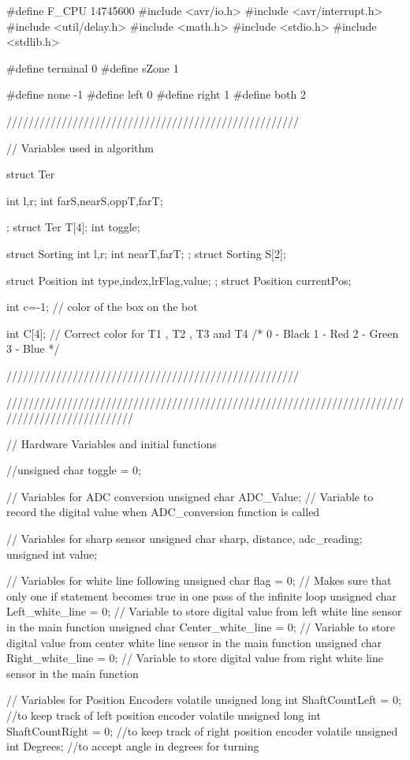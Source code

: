 #define F_CPU 14745600
#include <avr/io.h>
#include <avr/interrupt.h>
#include <util/delay.h>
#include <math.h>
#include <stdio.h>
#include <stdlib.h>

#define terminal 0
#define sZone 1

#define none -1
#define left 0
#define right 1
#define both 2

/////////////////////////////////////////////////////


// Variables used in algorithm

struct Ter
{
	
	int l,r;
	int farS,nearS,oppT,farT;
	};
struct Ter T[4];
int toggle;

struct Sorting
{
	int l,r;
	int nearT,farT;
};
struct Sorting S[2];

struct Position
{
       int type,index,lrFlag,value;
};
struct Position currentPos;


int c=-1; // color of the box on the bot

int C[4]; // Correct color for T1 , T2 , T3 and T4
/*
 0      -  Black
 1      -  Red
 2      -  Green
 3      -  Blue
*/




/////////////////////////////////////////////////////


///////////////////////////////////////////////////////////////////////////////////////////////

// Hardware Variables and initial functions

//unsigned char toggle = 0;

// Variables for ADC conversion
unsigned char ADC_Value;    // Variable to record the digital value when ADC_conversion function is called

// Variables for sharp sensor
unsigned char sharp, distance, adc_reading;
unsigned int value;

// Variables for white line following
unsigned char flag = 0;     // Makes sure that only one if statement becomes true in one pass of the infinite loop
unsigned char Left_white_line = 0;   // Variable to store digital value from left white line sensor in the main function
unsigned char Center_white_line = 0; // Variable to store digital value from center white line sensor in the main function
unsigned char Right_white_line = 0;  // Variable to store digital value from right white line sensor in the main function

// Variables for Position Encoders
volatile unsigned long int ShaftCountLeft = 0;  //to keep track of left position encoder
volatile unsigned long int ShaftCountRight = 0; //to keep track of right position encoder
volatile unsigned int Degrees;                  //to accept angle in degrees for turning

